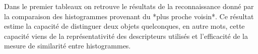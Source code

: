 \begin{figure}[H]
\end{figure}


{\color{green}
Dans le premier tableaux on retrouve le résultats de la reconnaissance donné par la comparaison des histogrammes provenant du *plus proche voisin*. Ce résultat estime la capacité de distinguer deux objets quelconques, en autre mots, cette capacité viens de la représentativité des descripteurs utilisés et l'efficacité de la mesure de similarité entre histogrammes.
}
